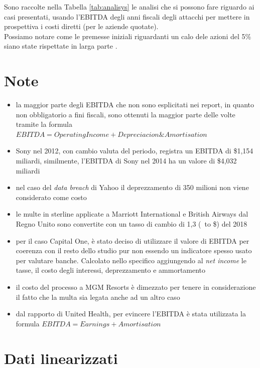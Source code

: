 \documentclass[12pt,a4paper,twoside]{report}
\begin{document}
Sono raccolte nella Tabella \ref{tab:analisys} le analisi che si possono fare riguardo ai casi presentati, usando l'EBITDA degli anni fiscali degli attacchi per mettere in prospettiva i costi diretti (per le aziende quotate).\\
Possiamo notare come le premesse iniziali riguardanti un calo dele azioni del 5\% siano state rispettate in larga parte \cite{accenture2010}.\\


\section{Note} 
\begin{itemize}
    \item la maggior parte degli EBITDA che non sono esplicitati nei report, in quanto non obbligatorio a fini fiscali, sono ottenuti la maggior parte delle volte tramite  la formula\\ $EBITDA = Operating Income + Depreciacion\&Amortisation$
    \item Sony nel 2012, con cambio valuta del periodo, registra un EBITDA di \$1,154 miliardi, similmente, l'EBITDA di Sony nel 2014 ha un valore di \$4,032 miliardi
    \item nel caso del \textit{data breach} di Yahoo il deprezzamento di 350 milioni non viene considerato come costo 
    \item le multe in sterline applicate a  Marriott  International e
     British Airways dal Regno Unito sono convertite con un 
     tasso di cambio di 1,3 (\textsterling\ to \$) del 2018
    \item per il caso Capital One, \`e stato deciso di utilizzare il valore di 
    EBITDA per coerenza con il resto dello studio pur non essendo
    un indicatore spesso usato per valutare  banche. Calcolato nello specifico
    aggiungendo al \textit{net income} le tasse, il costo degli interessi, deprezzamento e ammortamento
    \item il costo del processo a MGM Resorts \`e dimezzato per tenere
    in considerazione il fatto che la multa sia legata anche ad un altro caso
    \item dal rapporto di United Health, per evincere l'EBITDA  \`e stata 
    utilizzata la formula $ EBITDA = Earnings + Amortisation $
\end{itemize}



\section{Dati linearizzati}
\end{document}
